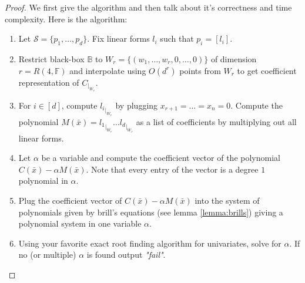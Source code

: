 \documentclass[12pt]{caltech_thesis}
\theoremstyle{plain}
\theoremstyle{definition}
\newcommand{\F}{\mathbb{F}}
\newcommand{\MS}{\mathcal{S}}
\newcommand{\CB}{\mathbb{B}}
\newcommand{\B}[1]{\bar{#1}}
\begin{document}
\begin{proof}
 We first give the algorithm and then talk about it's correctness and time complexity.
Here is the algorithm:

\begin{algorithm}[H]\label{algorithm:findothergate}

\begin{enumerate}

\item Let $\MS = \{p_1,\ldots,p_d\}$. Fix linear forms $l_i$ such that $p_i=[l_i]$. 

\item Restrict black-box $\CB$ to $W_r = \{(w_1,\ldots,w_r,0,\ldots,0)\}$ of dimension $r =R(4,\F)$ and interpolate
using $O(d^r)$ points from $W_r$ to get coefficient representation of $C_{|_{W_r}}$. 

\item For $i\in [d]$, compute ${l_i}_{|_{W_r}}$ by plugging $x_{r+1}=\ldots = x_n=0$. Compute the polynomial
$M(\B{x}) = {l_1}_{|_{W_r}}\ldots {l_d}_{|_{W_r}}$ as a list of coefficients by multiplying out all linear forms.

\item Let $\alpha$ be a variable and compute the coefficient vector of the polynomial $C(\B{x}) - \alpha M(\B{x})$. 
Note that every entry of the vector is a degree $1$ polynomial in $\alpha$.

\item Plug the coefficient vector of $C(\B{x}) -\alpha M(\B{x})$ into the system of polynomials given by brill's equations 
(see lemma \ref{lemma:brills})  giving a polynomial system in one variable $\alpha$. 

\item Using your favorite exact root finding algorithm for univariates, solve for $\alpha$. If no (or multiple) 
$\alpha$ is found output \emph{"fail"}.


\end{enumerate}
\end{algorithm}
\end{proof}
\end{document}
